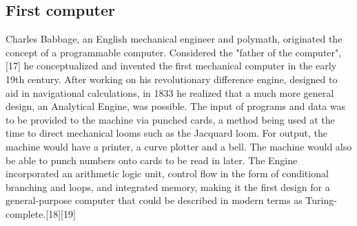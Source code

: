 \documentclass{article}
\begin{document}
\subsection{First computer}
Charles Babbage, an English mechanical engineer and polymath, originated the concept of a programmable computer. Considered the "father of the computer",[17] he conceptualized and invented the first mechanical computer in the early 19th century. After working on his revolutionary difference engine, designed to aid in navigational calculations, in 1833 he realized that a much more general design, an Analytical Engine, was possible. The input of programs and data was to be provided to the machine via punched cards, a method being used at the time to direct mechanical looms such as the Jacquard loom. For output, the machine would have a printer, a curve plotter and a bell. The machine would also be able to punch numbers onto cards to be read in later. The Engine incorporated an arithmetic logic unit, control flow in the form of conditional branching and loops, and integrated memory, making it the first design for a general-purpose computer that could be described in modern terms as Turing-complete.[18][19]
\end{document}
